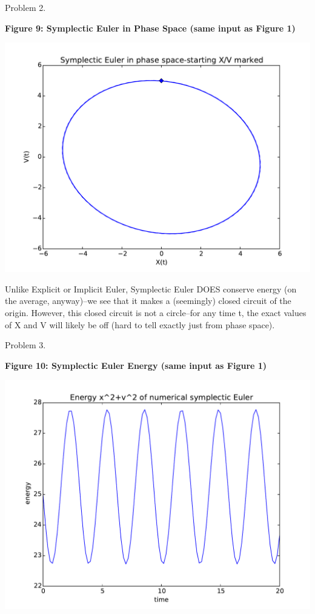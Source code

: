 \documentclass{article}
\begin{document}
\bigskip

Problem 2.


\begin{minipage}{1.0\textwidth}
\begin{center}
    \textbf{Figure 9: Symplectic Euler in Phase Space (same input as Figure 1)}\par\medskip
    \includegraphics[scale=0.7]{symp_phaseSpace}
\end{center}
\end{minipage}

Unlike Explicit or Implicit Euler, Symplectic Euler DOES conserve energy (on the average, anyway)--we see that it makes a (seemingly) closed circuit of the origin. However, this closed circuit is not a circle--for any time t, the exact values of X and V will likely be off (hard to tell exactly just from phase space). 

\bigskip

Problem 3.

\begin{minipage}{1.0\textwidth}
\begin{center}
    \textbf{Figure 10: Symplectic Euler Energy (same input as Figure 1)}\par\medskip
    \includegraphics[scale=1.0]{symp_energy}
\end{center}
\end{minipage}
\end{document}

